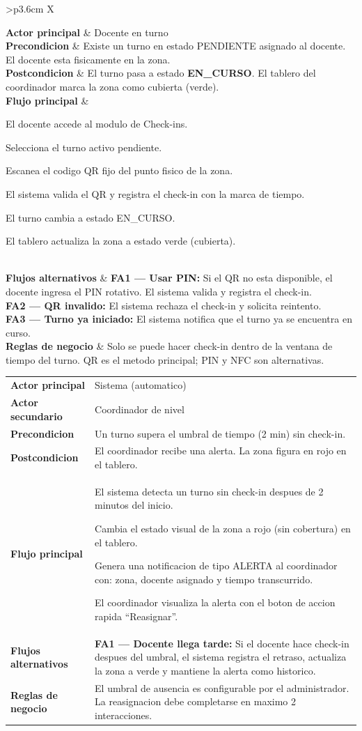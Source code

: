 \documentclass[12pt, a4paper]{article}
\newcommand{\cu}[3]{%
  \begin{tcolorbox}[casousostyle, title={#1},
    after title={\hfill\small\normalfont\color{white!80!azulOscuro}#2}]
  \renewcommand{\arraystretch}{1.35}
  \begin{tabularx}{\linewidth}{>{\bfseries\color{azulOscuro}\small}p{3.6cm} X}
  #3
  \end{tabularx}
  \end{tcolorbox}
  \vspace{6pt}
}
\newcommand{\fcu}[2]{\small\textbf{\color{azulOscuro}#1} & \small #2 \\}
\begin{document}
\cu{CU-04 --- Realizar check-in de turno}{Docente}{
  \fcu{Actor principal}{Docente en turno}
  \fcu{Precondicion}{Existe un turno en estado PENDIENTE asignado al docente. El docente esta fisicamente en la zona.}
  \fcu{Postcondicion}{El turno pasa a estado \textbf{EN\_CURSO}. El tablero del coordinador marca la zona como cubierta (verde).}
  \fcu{Flujo principal}{
    \begin{pasos}
      \item El docente accede al modulo de Check-ins.
      \item Selecciona el turno activo pendiente.
      \item Escanea el codigo QR fijo del punto fisico de la zona.
      \item El sistema valida el QR y registra el check-in con la marca de tiempo.
      \item El turno cambia a estado EN\_CURSO.
      \item El tablero actualiza la zona a estado verde (cubierta).
    \end{pasos}
  }
  \fcu{Flujos alternativos}{
    \textbf{FA1 --- Usar PIN:} Si el QR no esta disponible, el docente ingresa el PIN rotativo. El sistema valida y registra el check-in.\\[4pt]
    \textbf{FA2 --- QR invalido:} El sistema rechaza el check-in y solicita reintento.\\[4pt]
    \textbf{FA3 --- Turno ya iniciado:} El sistema notifica que el turno ya se encuentra en curso.
  }
  \fcu{Reglas de negocio}{Solo se puede hacer check-in dentro de la ventana de tiempo del turno. QR es el metodo principal; PIN y NFC son alternativas.}
}

\cu{CU-05 --- Alertar por ausencia de cobertura}{Sistema / Coordinador}{
  \fcu{Actor principal}{Sistema (automatico)}
  \fcu{Actor secundario}{Coordinador de nivel}
  \fcu{Precondicion}{Un turno supera el umbral de tiempo (2 min) sin check-in.}
  \fcu{Postcondicion}{El coordinador recibe una alerta. La zona figura en rojo en el tablero.}
  \fcu{Flujo principal}{
    \begin{pasos}
      \item El sistema detecta un turno sin check-in despues de 2 minutos del inicio.
      \item Cambia el estado visual de la zona a rojo (sin cobertura) en el tablero.
      \item Genera una notificacion de tipo ALERTA al coordinador con: zona, docente asignado y tiempo transcurrido.
      \item El coordinador visualiza la alerta con el boton de accion rapida ``Reasignar''.
    \end{pasos}
  }
  \fcu{Flujos alternativos}{
    \textbf{FA1 --- Docente llega tarde:} Si el docente hace check-in despues del umbral, el sistema registra el retraso, actualiza la zona a verde y mantiene la alerta como historico.
  }
  \fcu{Reglas de negocio}{El umbral de ausencia es configurable por el administrador. La reasignacion debe completarse en maximo 2 interacciones.}
}
\end{document}
